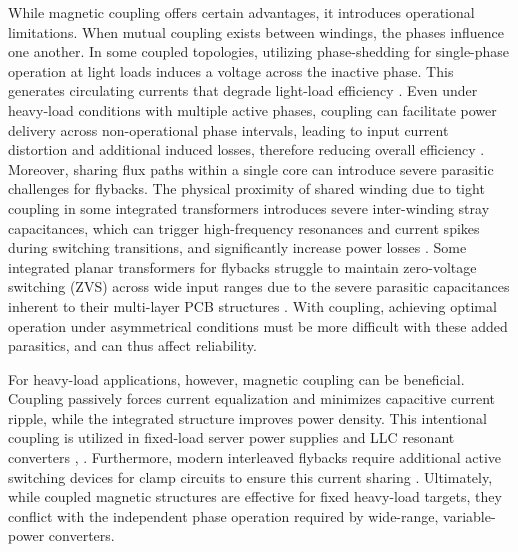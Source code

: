 \documentclass[lettersize,journal]{IEEEtran}
\begin{document}
While magnetic coupling offers certain advantages, it introduces operational limitations. When mutual coupling exists between windings, the phases influence one another. {\color{red}In some coupled  topologies, utilizing phase-shedding for single-phase operation at light loads induces a voltage across the inactive phase. This generates circulating currents that degrade light-load efficiency \cite{Yang_2020, Z_Li_2025}.} Even under heavy-load conditions with multiple active phases, coupling can facilitate power delivery across non-operational phase intervals, leading to input current distortion and additional induced losses, therefore reducing overall efficiency \cite{Yang_2020}. {\color{red}Moreover, sharing flux paths within a single core can introduce severe parasitic challenges for flybacks. The physical proximity of shared winding due to tight coupling in some integrated transformers introduces severe inter-winding stray capacitances, which can trigger high-frequency resonances and current spikes during switching transitions, and significantly increase power losses \cite{meng2021}. Some integrated planar transformers for flybacks struggle to maintain zero-voltage switching (ZVS) across wide input ranges due to the severe parasitic capacitances inherent to their multi-layer PCB structures \cite{kwon2024}. With coupling, achieving optimal operation under asymmetrical conditions must be more difficult with these added parasitics, and can thus affect reliability.}

For heavy-load applications, however, magnetic coupling can be beneficial. Coupling passively forces current equalization and minimizes capacitive current ripple, while the integrated structure improves power density. This intentional coupling is utilized in fixed-load server power supplies and LLC resonant converters \cite{Ahmad}, \cite{Dou, Nakakohara}. Furthermore, modern interleaved flybacks require additional active switching devices for clamp circuits to ensure this current sharing \cite{Z_Chen_s42835}. Ultimately, while coupled magnetic structures are effective for fixed heavy-load targets, they conflict with the independent phase operation required by wide-range, variable-power converters.
\end{document}
